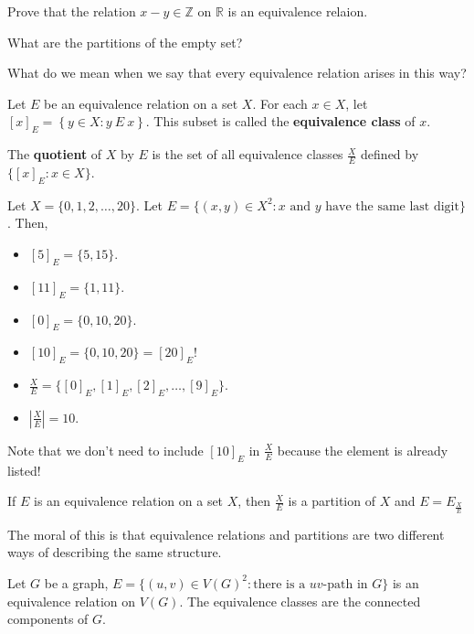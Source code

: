 \documentclass[a4paper]{article}
\begin{document}
Prove that the relation \( x-y \in \mathbb{Z} \) on \( \mathbb{R} \) is an equivalence relaion.

What are the partitions of the empty set?



What do we mean when we say that every equivalence relation arises in this way?

\begin{definition}
	Let \( E \) be an equivalence relation on a set \( X \). For each \( x \in X \), let \( \left[ x \right]_E = \left\{ y \in X \colon y ~E~ x \right\}  \). This subset is called the \textbf{equivalence class} of \( x \).
\end{definition}

\begin{definition}
	The \textbf{quotient} of \( X \) by \( E \) is the set of all equivalence classes \( \frac{X}{E} \) defined by \( \{[x]_E \colon x \in X\}   \).
\end{definition}

\begin{eg}
	Let \( X = \{0,1,2,\ldots ,20\}   \). Let \( E=\{(x,y) \in X^2 \colon x \text{ and } y \text{ have the same last digit}\}   \). Then, 
	\begin{itemize}
		\item \( [5]_E =  \{5,15\}   \).
		\item \( [11]_E=\{1,11\}   \).
		\item \( [0]_E=\{0,10,20\}   \).
		\item \( [10]_E=\{0,10,20\}   =[20]_E\)!
		\item \( \frac{X}{E}=\{[0]_E,[1]_E,[2]_E,\ldots ,[9]_E\} \).
		\item \( |\frac{X}{E}|=10 \).
	\end{itemize}
	Note that we don't need to include \( [10]_E \) in \( \frac{X}{E} \) because the element is already listed!
\end{eg}

\begin{theorem}
	If \( E \) is an equivalence relation on a set \( X \), then \( \frac{X}{E} \) is a partition of \( X \) and \( E=E_{\frac{X}{E}} \)
\end{theorem}

The moral of this is that equivalence relations and partitions are two different ways of describing the same structure.

\begin{eg}
	Let \( G \) be a graph, \( E=\{(u,v) \in V(G)^2 \colon \text{there is a } uv\text{-path in }G \} \) is an equivalence relation on \( V(G) \). The equivalence classes are the connected components of \( G \).
\end{eg}
\end{document}
